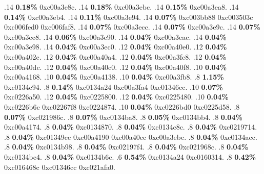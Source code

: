 \begin{profile}
{.14 \textbf{0.18\%} 0xc00a3e8c. 
.14 \textbf{0.18\%} 0xc00a3ebc. 
.14 \textbf{0.15\%} 0xc00a3ea8. 
.14 \textbf{0.14\%} 0xc00a3eb4. 
.14 \textbf{0.11\%} 0xc00a3e94. 
.14 \textbf{0.07\%} 0xc003bb88\newline {} 0xc003503c\newline {} 0xc006fed0\newline {} 0xc006faf8. 
.14 \textbf{0.07\%} 0xc00a3ecc. 
.14 \textbf{0.07\%} 0xc00a3e9c. 
.14 \textbf{0.07\%} 0xc00a3ec8. 
.14 \textbf{0.06\%} 0xc00a3e90. 
.14 \textbf{0.04\%} 0xc00a3eac. 
.14 \textbf{0.04\%} 0xc00a3e98. 
.14 \textbf{0.04\%} 0xc00a3ec0. 
.12 \textbf{0.04\%} 0xc00a40e0. 
.12 \textbf{0.04\%} 0xc00a402c. 
.12 \textbf{0.04\%} 0xc00a40a4. 
.12 \textbf{0.04\%} 0xc00a3fc8. 
.12 \textbf{0.04\%} 0xc00a40dc. 
.12 \textbf{0.04\%} 0xc00a40c0. 
.12 \textbf{0.04\%} 0xc00a40f8. 
.10 \textbf{0.04\%} 0xc00a4168. 
.10 \textbf{0.04\%} 0xc00a4138. 
.10 \textbf{0.04\%} 0xc00a3fb8. 
.8 \textbf{1.15\%} 0xc0134c94. 
.8 \textbf{0.14\%} 0xc0134a24\newline {} 0xc00a3fa4\newline {} 0xc01346cc. 
.10 \textbf{0.07\%} 0xc0226a50. 
.12 \textbf{0.04\%} 0xc0225800. 
.12 \textbf{0.04\%} 0xc0225480. 
.10 \textbf{0.04\%} 0xc0226b6c\newline {} 0xc02267f8\newline {} 0xc0224874. 
.10 \textbf{0.04\%} 0xc0226bd0\newline {} 0xc0225d58. 
.8 \textbf{0.07\%} 0xc021986c. 
.8 \textbf{0.07\%} 0xc0134ba8. 
.8 \textbf{0.05\%} 0xc0134bb4. 
.8 \textbf{0.04\%} 0xc00a4174. 
.8 \textbf{0.04\%} 0xc0134870. 
.8 \textbf{0.04\%} 0xc0134c8c. 
.8 \textbf{0.04\%} 0xc0219714. 
.8 \textbf{0.04\%} 0xc01349cc\newline {} 0xc00a4190\newline {} 0xc00a40cc\newline {} 0xc00a3ebc. 
.8 \textbf{0.04\%} 0xc0134acc. 
.8 \textbf{0.04\%} 0xc0134b98. 
.8 \textbf{0.04\%} 0xc02197f4. 
.8 \textbf{0.04\%} 0xc021968c. 
.8 \textbf{0.04\%} 0xc0134bc4. 
.8 \textbf{0.04\%} 0xc0134b6c. 
.6 \textbf{0.54\%} 0xc0134a24\newline {} 0xc0160314. 
.8 \textbf{0.42\%} 0xc016468c\newline {} 0xc01346cc\newline {} 0xc021afa0. 
}
\end{profile}
